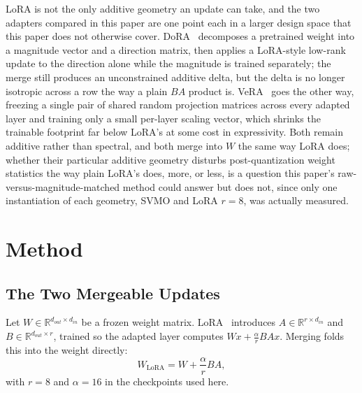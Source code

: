 \documentclass[conference]{IEEEtran}
\begin{document}
LoRA is not the only additive geometry an update can take, and the two adapters compared in this paper are one point each in a larger design space that this paper does not otherwise cover. DoRA~\cite{liu2024dora} decomposes a pretrained weight into a magnitude vector and a direction matrix, then applies a LoRA-style low-rank update to the direction alone while the magnitude is trained separately; the merge still produces an unconstrained additive delta, but the delta is no longer isotropic across a row the way a plain $BA$ product is. VeRA~\cite{kopiczko2024vera} goes the other way, freezing a single pair of shared random projection matrices across every adapted layer and training only a small per-layer scaling vector, which shrinks the trainable footprint far below LoRA's at some cost in expressivity. Both remain additive rather than spectral, and both merge into $W$ the same way LoRA does; whether their particular additive geometry disturbs post-quantization weight statistics the way plain LoRA's does, more, or less, is a question this paper's raw-versus-magnitude-matched method could answer but does not, since only one instantiation of each geometry, SVMO and LoRA $r=8$, was actually measured.

\section{Method}
\label{sec:method}

\subsection{The Two Mergeable Updates}

Let $W \in \mathbb{R}^{d_{out}\times d_{in}}$ be a frozen weight matrix. LoRA~\cite{hu2021lora} introduces $A \in \mathbb{R}^{r\times d_{in}}$ and $B \in \mathbb{R}^{d_{out}\times r}$, trained so the adapted layer computes $Wx + \frac{\alpha}{r}BAx$. Merging folds this into the weight directly:
\begin{equation}
W_{\text{LoRA}} = W + \frac{\alpha}{r}BA,
\label{eq:lora-merge}
\end{equation}
with $r=8$ and $\alpha=16$ in the checkpoints used here.
\end{document}
